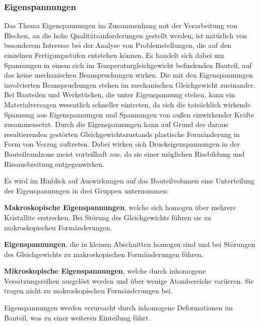\documentclass[12pt,a4paper,parskip,twoside,BCOR5mm,headsepline]{scrartcl}
\begin{document}
\begin{description*}
\begin{itemize*}
\subsubsection{Eigenspannungen}
Das Thema Eigenspannungen im Zusammenhang mit der Verarbeitung von Blechen,  an die hohe Qualitätsanforderungen gestellt werden,  ist natürlich von besonderem Interesse bei der Analyse von Problemstellungen,  die auf den einzelnen Fertigungsstufen entstehen können. Es handelt sich dabei um Spannungen in einem sich im Temperaturgleichgewicht befindenden Bauteil, auf das keine mechanischen Beanspruchungen wirken. Die mit den Eigenspannungen involvierten  Beanspruchungen stehen im mechanischen Gleichgewicht zueinander. Bei Bauteilen und Werkstücken,  die unter Eigenspannung stehen,  kann ein Materialversagen wesentlich schneller eintreten,  da sich die tatsächlich wirkende Spannung aus Eigenspannungen und Spannungen von außen einwirkender Kräfte zusammensetzt. Durch die Eigenspannungen kann auf Grund des daraus resultierenden gestörten Gleichgewichtszustands plastische Formänderung in Form von Verzug auftreten.
Dabei wirken sich Druckeigenspannungen in der Bauteilrandzone meist vorteilhaft aus,  da sie einer möglichen Rissbildung und Rissausbreitung entgegenwirken.


Es wird im Hinblick auf Auswirkungen auf das Bauteilvolumen eine Unterteilung der Eigenspannungen in drei Gruppen unternommen:
\begin{enumerate*}
\item \textbf{Makroskopische Eigenspannungen}, welche sich homogen über mehrere Kristallite erstrecken. Bei Störung des Gleichgewichts führen sie zu makroskopischen Formänderungen.
\item \textbf{Eigenspannungen}, die in kleinen Abschnitten homogen sind und bei Störungen des Gleichgewichts zu makroskopischen Formänderungen führen.
\item \textbf{Mikroskopische Eigenspannungen}, welche durch inhomogene Versetzungsreihen ausgelöst werden und über wenige Atombereiche variieren. Sie tragen nicht zu makroskopischen Formänderungen bei. 


\end{enumerate*}

Eigenspannungen werden verursacht durch inhomogene Deformationen im Bauteil, was zu einer weiteren Einteilung führt.


\end{itemize*}
\end{description*}
\end{document}
